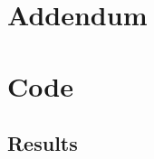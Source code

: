\documentclass{article}
\begin{document}
    \section*{Addendum}
    \section*{Code}
    \subsection*{Results}
\end{document}
